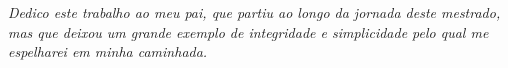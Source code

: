 \begin{dedicatoria}
   \vspace*{\fill}
   \textit{
      Dedico este trabalho ao meu pai, que partiu ao longo da jornada deste mestrado, mas que deixou um grande exemplo de integridade e simplicidade pelo qual me espelharei em minha caminhada.
   }
\end{dedicatoria}
